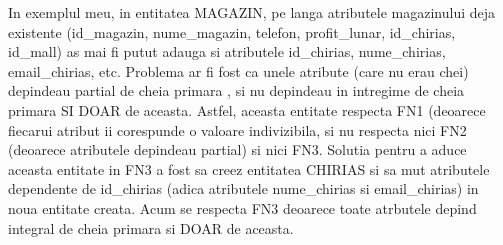 In exemplul meu, in entitatea MAGAZIN, pe langa atributele magazinului deja
existente (id\_magazin, nume\_magazin, telefon, profit\_lunar, id\_chirias, id\_mall) as mai fi putut adauga si atributele id\_chirias, nume\_chirias, email\_chirias, etc. Problema ar fi fost ca unele atribute (care nu erau chei) depindeau partial de cheia primara , si nu depindeau in intregime de cheia primara SI DOAR de aceasta. Astfel, aceasta entitate respecta FN1 (deoarece fiecarui atribut ii corespunde o valoare indivizibila, si nu respecta
nici FN2 (deoarece atributele depindeau partial) si nici FN3. Solutia pentru a aduce aceasta entitate in FN3 a fost sa creez entitatea CHIRIAS si sa mut atributele dependente de id\_chirias (adica atributele nume\_chirias si email\_chirias) in noua entitate creata. Acum se respecta FN3 deoarece toate atrbutele depind integral de cheia primara si DOAR de aceasta. 
